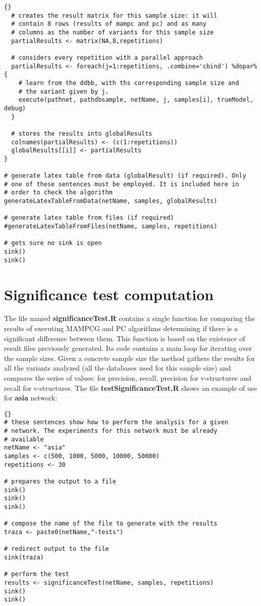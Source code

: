 \documentclass[11pt,professionalfont]{article}
\begin{document}
\begin{small}
\begin{lstlisting}[]{}
  # creates the result matrix for this sample size: it will
  # contain 8 rows (results of mampc and pc) and as many
  # columns as the number of variants for this sample size
  partialResults <- matrix(NA,8,repetitions)
  
  # considers every repetition with a parallel approach
  partialResults <- foreach(j=1:repetitions, .combine='cbind') %dopar% {
    # learn from the ddbb, with ths corresponding sample size and
    # the variant given by j. 
    execute(pathnet, pathdbsample, netName, j, samples[i], trueModel, debug)
  }
  
  # stores the results into globalResults
  colnames(partialResults) <- (c(1:repetitions))
  globalResults[[i]] <- partialResults
}

# generate latex table from data (globalResult) (if required). Only
# one of these sentences must be employed. It is included here in
# order to check the algorithm
generateLatexTableFromData(netName, samples, globalResults)

# generate latex table from files (if required)
#generateLatexTableFromFiles(netName, samples, repetitions)

# gets sure no sink is open
sink()
sink()
\end{lstlisting}
\end{small}

\section{Significance test computation}

The file named \textbf{significanceTest.R} contains a single function
for comparing the results of executing MAMPCG and PC algorithms determining
if there is a significant difference between them. This function is based
on the existence of result files previously generated. Its code contains
a main loop for iterating over the sample sizes. Given a concrete sample
size the method gathers the results for all the variants analyzed (all the
databases used for this sample size) and compares the series of values:
for precision, recall, precision for v-structures and recall for v-structures.
The file \textbf{testSignificanceTest.R} shows an example of use for 
\textbf{asia} network:

\begin{small}
\lstset{linewidth=150mm}
\begin{lstlisting}[]{}
# these sentences show how to perform the analysis for a given
# network. The experiments for this network must be already
# available
netName <- "asia"
samples <- c(500, 1000, 5000, 10000, 50000)
repetitions <- 30

# prepares the output to a file
sink()
sink()
sink()

# compose the name of the file to generate with the results
traza <- paste0(netName,"-tests")

# redirect output to the file
sink(traza)

# perform the test
results <- significanceTest(netName, samples, repetitions)
sink()
sink()
\end{lstlisting}
\end{small}
\end{document}
